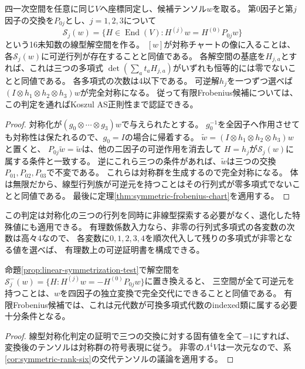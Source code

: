 \begin{proposition}[対称チャート所属の有限線型判定]\label{prop:linear-symmetrization-test}
四一次空間を任意に同じ$V$へ座標同定し、候補テンソル$w$を取る。
第0因子と第$j$因子の交換を$P_{0j}$とし、$j=1,2,3$について
\[
 \mathcal S_j(w)=\{H\in\operatorname{End}(V):
           H^{(j)}w=H^{(0)}P_{0j}w\}
\]
という16未知数の線型解空間を作る。
$[w]$が対称チャートの像に入ることは、各$\mathcal S_j(w)$に可逆行列が存在することと同値である。
各解空間の基底を$H_{j,a}$とすれば、これは三つの多項式
$\det(\sum_a t_aH_{j,a})$がいずれも恒等的には零でないことと同値である。
各多項式の次数は4以下である。
可逆解$h_j$を一つずつ選べば$(I\otimes h_1\otimes h_2\otimes h_3)w$が完全対称になる。
従って有限Frobenius候補については、この判定を通ればKoszul AS正則性まで認証できる。
\end{proposition}
\begin{proof}
対称化が$(g_0\otimes\cdots\otimes g_3)w$で与えられたとする。
$g_0^{-1}$を全因子へ作用させても対称性は保たれるので、$g_0=I$の場合に帰着する。
$\widetilde w=(I\otimes h_1\otimes h_2\otimes h_3)w$と置くと、
$P_{0j}\widetilde w=\widetilde w$は、他の二因子の可逆作用を消去して
$H=h_j$が$\mathcal S_j(w)$に属する条件と一致する。
逆にこれら三つの条件があれば、$\widetilde w$は三つの交換$P_{01},P_{02},P_{03}$で不変である。
これらは対称群を生成するので完全対称になる。
体は無限だから、線型行列族が可逆元を持つことはその行列式が零多項式でないことと同値である。
最後に定理\ref{thm:symmetric-frobenius-chart}を適用する。
\end{proof}
\begin{remark}
この判定は対称化の三つの行列を同時に非線型探索する必要がなく、退化した特殊値にも適用できる。
有理数係数入力なら、非零の行列式多項式の各変数の次数は高々4なので、
各変数に$0,1,2,3,4$を順次代入して残りの多項式が非零となる値を選べば、
有理数上の可逆証明書を構成できる。
\end{remark}

\begin{corollary}[可換多項式indexed類の線型認識]\label{cor:linear-alternating-test}
命題\ref{prop:linear-symmetrization-test}で解空間を
$\mathcal S_j^-(w)=\{H:H^{(j)}w=-H^{(0)}P_{0j}w\}$に置き換えると、
三空間が全て可逆元を持つことは、$w$を四因子の独立変換で完全交代にできることと同値である。
有限Frobenius候補では、これは元代数が可換多項式代数のindexed類に属する必要十分条件となる。
\end{corollary}
\begin{proof}
線型対称化判定の証明で三つの交換に対する固有値を全て$-1$にすれば、
変換後のテンソルは対称群の符号表現に従う。
非零の$\Lambda^4 V$は一次元なので、系\ref{cor:symmetric-rank-six}の交代テンソルの議論を適用する。
\end{proof}


